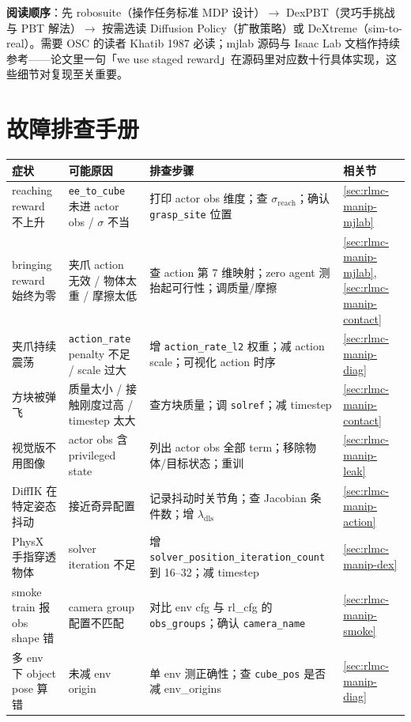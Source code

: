\textbf{阅读顺序}：先 robosuite（操作任务标准 MDP 设计）$\to$ DexPBT（灵巧手挑战与 PBT 解法）$\to$ 按需选读 Diffusion Policy（扩散策略）或 DeXtreme（sim-to-real）。需要 OSC 的读者 Khatib 1987 必读；mjlab 源码与 Isaac Lab 文档作持续参考——论文里一句「we use staged reward」在源码里对应数十行具体实现，这些细节对复现至关重要。

\section*{故障排查手册}
\label{sec:rlmc-manip-troubleshoot}

\begin{center}
\small
\begin{tabular}{@{}p{3.2cm}p{3.0cm}p{4.4cm}l@{}}
\toprule
症状 & 可能原因 & 排查步骤 & 相关节 \\
\midrule
reaching reward 不上升 & \verb|ee_to_cube| 未进 actor obs / $\sigma$ 不当 & 打印 actor obs 维度；查 $\sigma_{\text{reach}}$；确认 \verb|grasp_site| 位置 & \cref{sec:rlmc-manip-mjlab} \\
bringing reward 始终为零 & 夹爪 action 无效 / 物体太重 / 摩擦太低 & 查 action 第 7 维映射；zero agent 测抬起可行性；调质量/摩擦 & \cref{sec:rlmc-manip-mjlab}, \cref{sec:rlmc-manip-contact} \\
夹爪持续震荡 & \verb|action_rate| penalty 不足 / scale 过大 & 增 \verb|action_rate_l2| 权重；减 action scale；可视化 action 时序 & \cref{sec:rlmc-manip-diag} \\
方块被弹飞 & 质量太小 / 接触刚度过高 / timestep 太大 & 查方块质量；调 \verb|solref|；减 timestep & \cref{sec:rlmc-manip-contact} \\
视觉版不用图像 & actor obs 含 privileged state & 列出 actor obs 全部 term；移除物体/目标状态；重训 & \cref{sec:rlmc-manip-leak} \\
DiffIK 在特定姿态抖动 & 接近奇异配置 & 记录抖动时关节角；查 Jacobian 条件数；增 $\lambda_{\text{dls}}$ & \cref{sec:rlmc-manip-action} \\
PhysX 手指穿透物体 & solver iteration 不足 & 增 \verb|solver_position_iteration_count| 到 16--32；减 timestep & \cref{sec:rlmc-manip-dex} \\
smoke train 报 obs shape 错 & camera group 配置不匹配 & 对比 env cfg 与 rl\_cfg 的 \verb|obs_groups|；确认 \verb|camera_name| & \cref{sec:rlmc-manip-smoke} \\
多 env 下 object pose 算错 & 未减 env origin & 单 env 测正确性；查 \verb|cube_pos| 是否减 env\_origins & \cref{sec:rlmc-manip-diag} \\

\end{tabular}
\end{center}
